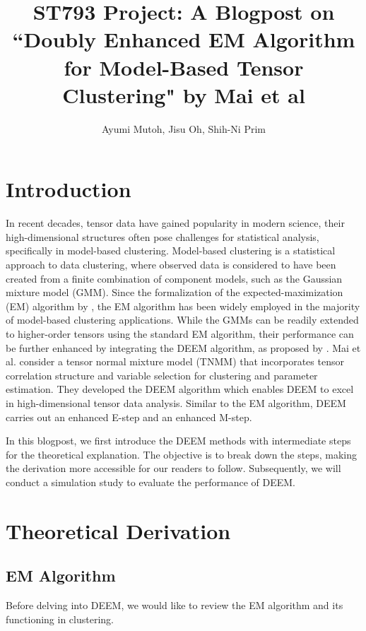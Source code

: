 \documentclass[11pt]{article}
\title{ST793 Project: A Blogpost on ``Doubly Enhanced EM Algorithm for Model-Based Tensor Clustering" by Mai et al}
\author{Ayumi Mutoh, Jisu Oh, Shih-Ni Prim}
\begin{document}
\maketitle

\section{Introduction}

In recent decades, tensor data have gained popularity in modern science, their high-dimensional structures often pose challenges for statistical analysis, specifically in model-based clustering. Model-based clustering is a statistical approach to data clustering, where observed data is considered to have been created from a finite combination of component models, such as the Gaussian mixture model (GMM). Since the formalization of the expected-maximization (EM) algorithm by \cite{dempster1977EM}, the EM algorithm has been widely employed in the majority of model-based clustering applications. While the GMMs can be readily extended to higher-order tensors using the standard EM algorithm, their performance can be further enhanced by integrating the DEEM algorithm, as proposed by \cite{mai2022DEEM}. Mai et al. consider a tensor normal mixture model (TNMM) that incorporates tensor correlation structure and variable selection for clustering and parameter estimation. They developed the DEEM algorithm which enables DEEM to excel in high-dimensional tensor data analysis. Similar to the EM algorithm, DEEM carries out an enhanced E-step and an enhanced M-step. 

In this blogpost, we first introduce the DEEM methods with intermediate
steps for the theoretical explanation. The objective is to break down the steps, making the derivation more accessible for our readers to follow. Subsequently, we will conduct a simulation study to evaluate the performance of DEEM.

 
\section{Theoretical Derivation}
\subsection{EM Algorithm}
Before delving into DEEM, we would like to review the EM algorithm and its functioning in clustering.
\end{document}
